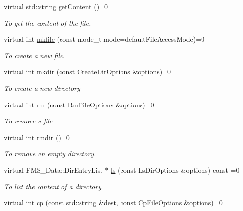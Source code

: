\begin{DoxyCompactItemize}
virtual std::string \hyperlink{classFileProxy_abcee2624975ecc29a47d45e50aedc807}{getContent} ()=0
\begin{DoxyCompactList}\small\item\em To get the content of the file. \item\end{DoxyCompactList}\item 
virtual int \hyperlink{classFileProxy_a23a6d0ddfc62d7df31cc677adddd58d8}{mkfile} (const mode\_\-t mode=defaultFileAccessMode)=0
\begin{DoxyCompactList}\small\item\em To create a new file. \item\end{DoxyCompactList}\item 
virtual int \hyperlink{classFileProxy_ae63d8edc448f5276a8174d9d05843b0c}{mkdir} (const CreateDirOptions \&options)=0
\begin{DoxyCompactList}\small\item\em To create a new directory. \item\end{DoxyCompactList}\item 
virtual int \hyperlink{classFileProxy_ac1f6106e6b799eb2118a9badaca68176}{rm} (const RmFileOptions \&options)=0
\begin{DoxyCompactList}\small\item\em To remove a file. \item\end{DoxyCompactList}\item 
virtual int \hyperlink{classFileProxy_a7d2495abbcfab9828df3c11815db1866}{rmdir} ()=0
\begin{DoxyCompactList}\small\item\em To remove an empty directory. \item\end{DoxyCompactList}\item 
virtual FMS\_\-Data::DirEntryList $\ast$ \hyperlink{classFileProxy_a642a602cd4635367981cd4e6616ea0a4}{ls} (const LsDirOptions \&options) const =0
\begin{DoxyCompactList}\small\item\em To list the content of a directory. \item\end{DoxyCompactList}\item 
virtual int \hyperlink{classFileProxy_a857ef4fd0f9b469e0d6edb8a7b932f18}{cp} (const std::string \&dest, const CpFileOptions \&options)=0

\end{DoxyCompactItemize}
